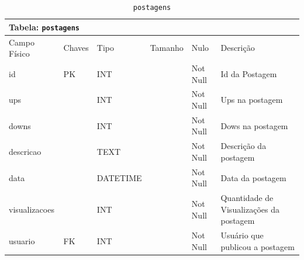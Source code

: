 \documentclass[12pt,a4paper]{article}
\begin{document}
\begin{center}
\begin{table}[h!]
	\caption{\texttt{postagens}}
	\label{tabela:postagens}
	\begin{tabular}{|p{2.3cm}|p{1.2cm}|p{1.8cm}|p{1.5cm}|p{1cm}|p{6cm}|}\hline		
		\multicolumn{6}{|p{16cm}|}{\cellcolor{cinzaClaro}  \centering Tabela: \texttt{postagens}} \\ \hline %
		{\small Campo Físico}   & {\small Chaves} & {\small Tipo} & {\small Tamanho} & {\small Nulo} & {\small Descrição}\\\hline %
		
		{\tiny id} & {\tiny PK} & {\tiny INT} & {\tiny } & {\tiny Not Null} &{\tiny Id da Postagem }\\\hline
		{\tiny ups} & {\tiny } & {\tiny INT} & {\tiny } & {\tiny Not Null} &{\tiny Ups na postagem}\\\hline
		{\tiny downs} & {\tiny } & {\tiny INT} & {\tiny } & {\tiny Not Null} &{\tiny Dows na postagem}\\\hline
		{\tiny descricao} & {\tiny } & {\tiny TEXT} & {\tiny } & {\tiny Not Null} &{\tiny Descrição da postagem}\\\hline
		{\tiny data} & {\tiny } & {\tiny DATETIME} & {\tiny } & {\tiny Not Null} &{\tiny Data da postagem}\\\hline
		{\tiny visualizacoes} & {\tiny } & {\tiny INT} & {\tiny } & {\tiny Not Null} &{\tiny Quantidade de Visualizações da postagem}\\\hline
		{\tiny usuario} & {\tiny FK} & {\tiny INT} & {\tiny } & {\tiny Not Null} &{\tiny Usuário que publicou a postagem}\\\hline
		
			
	\end{tabular}
\end{table}	
\end{center}
\end{document}
